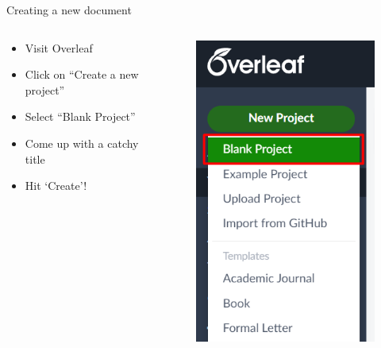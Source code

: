 \documentclass{beamer}
\begin{document}
\begin{frame}{Creating a new document}
    \begin{columns}
        \begin{column}{0.5\textwidth}
            \begin{itemize}
                \item Visit Overleaf
                \item Click on ``Create a new project''
                \item Select ``Blank Project''
                \item Come up with a catchy title
                \item Hit `Create'!
            \end{itemize}
        \end{column}
        \begin{column}{0.5\textwidth}
            \begin{figure}[h]
                \includegraphics[scale=0.6]{./assets/new-project.png}
            \end{figure}
        \end{column}
    \end{columns}
\end{frame}
\end{document}
